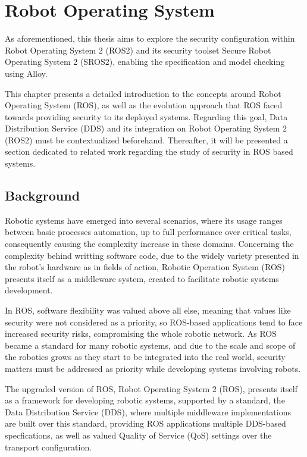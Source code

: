 \chapter{Robot Operating System}\label{c:ros}

As aforementioned, this thesis aims to explore the security configuration within Robot Operating System 2 (ROS2) and its security toolset Secure Robot Operating System 2 (SROS2), enabling the specification and model checking using Alloy. 

This chapter presents a detailed introduction to the concepts around Robot Operating System (ROS), as well as the evolution approach that ROS faced towards providing security to its deployed systems. Regarding this goal, Data Distribution Service (DDS) and its integration on Robot Operating System 2 (ROS2) must be contextualized beforehand. Thereafter, it will be presented a section dedicated to related work regarding the study of security in ROS based systems.

\section{Background}\label{s:ros-back}

Robotic systems have emerged into several scenarios, where its usage ranges between basic processes automation, up to full performance over critical tasks, consequently causing the complexity increase in these domains. Concerning the complexity behind writting software code, due to the widely variety presented in the robot's hardware as in fields of action, Robotic Operation System (ROS) presents itself as a middleware system, created to facilitate robotic systems development.

In ROS, software flexibility was valued above all else, meaning that values like security were not considered as a priority, so ROS-based applications tend to face increased security risks, compromising the whole robotic network. As ROS became a standard for many robotic systems, and due to the scale and scope of the robotics grows as they start to be integrated into the real world, security matters must be addressed as priority while developing systems involving robots. \cite{diluoffo2018robot, kim2018security}

The upgraded version of ROS, Robot Operating System 2 (ROS), presents itself as a framework for developing robotic systems, supported by a standard, the Data Distribution Service (DDS), where multiple middleware implementations are built over this standard, providing ROS applications multiple DDS-based specfications, as well as valued Quality of Service (QoS) settings over the transport configuration. 

